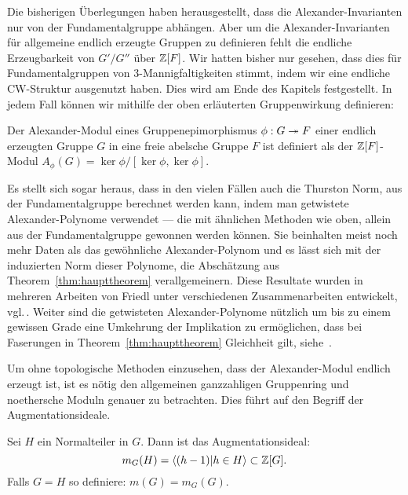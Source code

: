 Die bisherigen Überlegungen haben herausgestellt, dass die Alexander-Invarianten nur von der Fundamentalgruppe abhängen. Aber um die Alexander-Invarianten für allgemeine endlich erzeugte Gruppen zu definieren fehlt die endliche Erzeugbarkeit von $G'/G''$ über $\mathbb{Z}[F]$. Wir hatten bisher nur gesehen, dass dies für Fundamentalgruppen von 3-Mannigfaltigkeiten stimmt, indem wir eine endliche CW-Struktur ausgenutzt haben. Dies wird am Ende des Kapitels festgestellt. In jedem Fall können wir mithilfe der oben erläuterten Gruppenwirkung definieren:
\begin{defn}
	Der Alexander-Modul eines Gruppenepimorphismus $\phi: G \twoheadrightarrow F$ einer endlich erzeugten Gruppe $G$ in eine freie abelsche Gruppe $F$ ist definiert als der $\mathbb{Z}[F]$-Modul $A_\phi(G)=\ker \phi / [\ker\phi,\ker\phi]$.
\end{defn}

\begin{bem}
Es stellt sich sogar heraus, dass in den vielen Fällen auch die Thurston Norm, aus der Fundamentalgruppe berechnet werden kann, indem man getwistete Alexander-Polynome verwendet --- die mit ähnlichen Methoden wie oben, allein aus der Fundamentalgruppe gewonnen werden können. Sie beinhalten meist noch mehr Daten als das gewöhnliche Alexander-Polynom und es lässt sich mit der induzierten Norm dieser Polynome, die Abschätzung aus Theorem~\ref{thm:haupttheorem} verallgemeinern. Diese Resultate wurden in mehreren Arbeiten von Friedl unter verschiedenen Zusammenarbeiten entwickelt, vgl.\,\cite{Friedl.2011,Friedl.2008,Friedl.2008b,Friedl.2007,Friedl.2006,Friedl.2008c}. Weiter sind die getwisteten Alexander-Polynome nützlich um bis zu einem gewissen Grade eine Umkehrung der Implikation zu ermöglichen, dass bei Faserungen in Theorem~\ref{thm:haupttheorem} Gleichheit gilt, siehe~\cite{Friedl.2006,Friedl.2008b}.
\end{bem}

Um ohne topologische Methoden einzusehen, dass der Alexander-Modul endlich erzeugt ist, ist es nötig den allgemeinen ganzzahligen Gruppenring und noethersche Moduln genauer zu betrachten. Dies führt auf den Begriff der Augmentationsideale.

\begin{defn}[Augmentationsideal]
\label{def:augmentation}
	Sei $H$ ein Normalteiler in $G$. Dann ist das Augmentationsideal:
	\[
		m_G(H) = \langle (h-1)| h\in H \rangle \subset \mathbb{Z}[G].
	\]
	Falls $G=H$ so definiere: $m(G)=m_G(G)$.
\end{defn}

